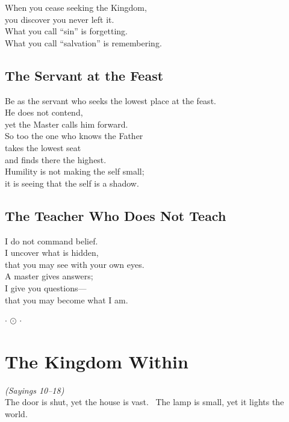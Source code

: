 \documentclass[10pt, openright]{book}
\newcommand{\ornament}{
    \vspace{1.5cm}
    \begin{center}
        \large $\cdot$ $\odot$ $\cdot$
    \end{center}
    \vspace{1.5cm}
}
\begin{document}
When you cease seeking the Kingdom, \\
you discover you never left it. \\

What you call ``sin'' is forgetting. \\
What you call ``salvation'' is remembering.

\section{The Servant at the Feast}
Be as the servant who seeks the lowest place at the feast. \\
He does not contend, \\
yet the Master calls him forward. \\

So too the one who knows the Father \\
takes the lowest seat \\
and finds there the highest. \\

Humility is not making the self small; \\
it is seeing that the self is a shadow.

\section{The Teacher Who Does Not Teach}
I do not command belief. \\
I uncover what is hidden, \\
that you may see with your own eyes. \\

A master gives answers; \\
I give you questions— \\
that you may become what I am.

\ornament

\chapter{The Kingdom Within}
\begin{center}
    	\textit{(Sayings 10--18)} \\
    \vspace{0.5cm}
    \small The door is shut, yet the house is vast. \ The lamp is small, yet it lights the world.
\end{center}
\vspace{0.5cm}
\end{document}
